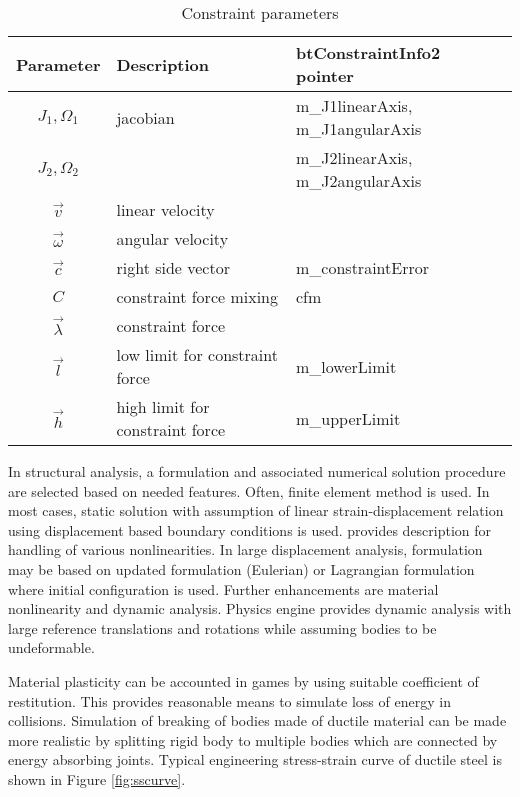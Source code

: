 \begin {table}[htb!]
\caption {Constraint parameters}
\label{tab:constraintParameters} 
\begin{center}
\begin{tabular}{|c| l| l|}
\hline
{\bf Parameter} & {\bf Description} & {\bf btConstraintInfo2 pointer}\\  \hline
$J_1, \Omega_1$ & jacobian & m\_J1linearAxis, m\_J1angularAxis \\
$J_2, \Omega_2$ & & m\_J2linearAxis, m\_J2angularAxis \\ \hline
$\vec{v}$ & linear velocity & \\ \hline
$\vec{\omega}$ & angular velocity & \\ \hline
$\vec{c}$        &  right side vector   & m\_constraintError \\ \hline
$C$  & constraint force mixing & cfm \\  \hline
$\vec{\lambda}$ & constraint force &  \\ \hline
$\vec{l}$ & low limit for constraint force & m\_lowerLimit \\ \hline
$\vec{h}$ & high limit for constraint force & m\_upperLimit \\ \hline
\end {tabular}
\end{center}
\end {table}


In structural analysis, a formulation and associated numerical solution procedure are selected 
based on needed features.
Often,  finite element method is used.
In most cases, static solution with assumption of linear strain-displacement relation
using displacement based boundary conditions is used.
\citet{bathe-1975} provides description for handling of various nonlinearities.
In large displacement analysis, formulation may be based on updated formulation (Eulerian) or
Lagrangian formulation where initial configuration is used.
Further enhancements are material nonlinearity and dynamic analysis.
Physics engine provides dynamic analysis with large reference translations and rotations
while assuming bodies to be undeformable.

Material plasticity can be accounted in games by using suitable coefficient of restitution.
This provides reasonable means to simulate loss of energy in collisions.
Simulation of breaking of bodies made of ductile material can be made more realistic by splitting rigid body
to multiple bodies which are connected by energy absorbing joints.
Typical engineering stress-strain curve of ductile steel is shown in Figure \ref{fig:sscurve}.

